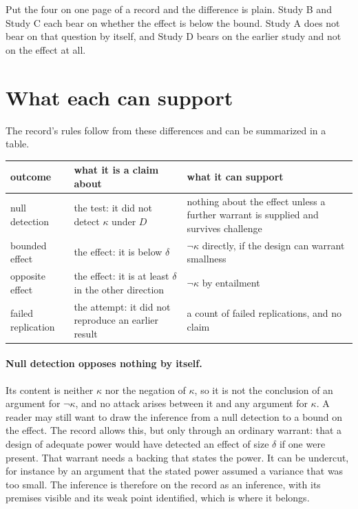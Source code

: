 \documentclass[11pt]{article}
\newcommand{\nk}[1]{\neg #1}
\begin{document}
Put the four on one page of a record and the difference is plain. Study B and Study C each bear on whether the effect is below the bound. Study A does not bear on that question by itself, and Study D bears on the earlier study and not on the effect at all.

\section{What each can support}\label{sec:support}

The record's rules follow from these differences and can be summarized in a table.

\begin{center}
\small
\begin{tabularx}{\textwidth}{@{}l X X@{}}
\toprule
outcome & what it is a claim about & what it can support\\
\midrule
null detection & the test: it did not detect $\kappa$ under $D$ & nothing about the effect unless a further warrant is supplied and survives challenge\\
bounded effect & the effect: it is below $\delta$ & $\nk\kappa$ directly, if the design can warrant smallness\\
opposite effect & the effect: it is at least $\delta$ in the other direction & $\nk\kappa$ by entailment\\
failed replication & the attempt: it did not reproduce an earlier result & a count of failed replications, and no claim\\
\bottomrule
\end{tabularx}
\end{center}

\paragraph{Null detection opposes nothing by itself.} Its content is neither $\kappa$ nor the negation of $\kappa$, so it is not the conclusion of an argument for $\nk\kappa$, and no attack arises between it and any argument for $\kappa$. A reader may still want to draw the inference from a null detection to a bound on the effect. The record allows this, but only through an ordinary warrant: that a design of adequate power would have detected an effect of size $\delta$ if one were present. That warrant needs a backing that states the power. It can be undercut, for instance by an argument that the stated power assumed a variance that was too small. The inference is therefore on the record as an inference, with its premises visible and its weak point identified, which is where it belongs.
\end{document}
